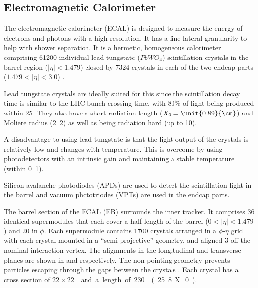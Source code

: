 
\subsection{Electromagnetic Calorimeter}
The electromagnetic calorimeter (ECAL) is designed to measure the energy of
electrons and photons with a high resolution. It has a fine lateral granularity
to help with shower separation. It is a hermetic, homogeneous calorimeter
comprising 61200 individual lead tungstate ($PbWO_{4}$) scintillation crystals
in the barrel region ($|\eta|<1.479$) closed by 7324 crystals in each of the two
endcap parts ($1.479<|\eta|<3.0$) \cite{ecal1997technical}.

Lead tungstate crystals are ideally suited for this since the scintillation
decay time is similar to the LHC bunch crossing time, 
with $80\%$ of light being produced within \unit{25}{\ns}.
They also have a short radiation length ($X_0=\unit{0.89}{\cm}$) 
and Moliere radius (\unit{2.2}{\cm}) as well as being radiation hard
(up to \unit{10}{\mrad}).

A disadvantage to using lead tungstate is that the light output of the crystals
is relatively low and changes with temperature. This is overcome by using
photodetectors with an intrinsic gain and maintaining a stable temperature
(within \unit{0.1}{\degreecelsius}).

Silicon avalanche photodiodes (APDs) are used to detect the scintillation light
in the barrel and vacuum phototriodes (VPTs) are used in the endcap parts.

The barrel section of the ECAL (EB) surrounds the inner tracker. It comprises 36
identical supermodules that each cover a half length of the barrel
($0<|\eta|<1.479$) and \unit{20}{\degree} in $\phi$. Each supermodule contains 1700
crystals arranged in a $\phi$-$\eta$ grid with each crystal mounted in a
``semi-projective'' geometry, and aligned \unit{3}{\degree} off the nominal
interaction vertex.  The alignments in the longitudinal and transverse planes
are shown in  and 
respectively. The non-pointing geometry prevents particles escaping through the
gaps between the crystals \cite{ecal1997technical}.  Each crystal has a
cross section of \unit{$22 \times 22$}{\mm\squared} and a length of
\unit{230}{\mm} (\unit{25.8}{X_0}).

